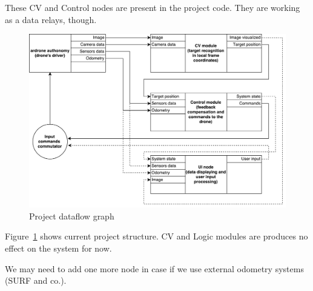 \documentclass[11pt]{article}
\begin{document}
    These CV and Control nodes are present in the project code.
    They are working as a data relays, though.

    \begin{figure}[ht!]
        \noindent\centering
            \includegraphics[width=\textwidth]{nodes.pdf}
        \caption{Project dataflow graph}
        \label{fig:DFGraph}
    \end{figure}

    Figure~\ref{fig:DFGraph} shows current project structure.
    CV and Logic modules are produces no effect on the system for now.

    We may need to add one more node in case if we use external odometry
    systems (SURF and co.).

    \newpage

    \setcounter{page}{1}
\end{document}
